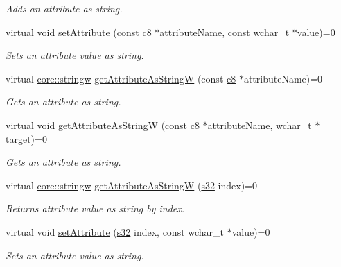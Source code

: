 \begin{DoxyCompactItemize}
\begin{DoxyCompactList}\small\item\em Adds an attribute as string. \end{DoxyCompactList}\item 
virtual void \hyperlink{classirr_1_1io_1_1IAttributes_a61d592097529c763c1da1db8ef5af224}{set\+Attribute} (const \hyperlink{namespaceirr_a9395eaea339bcb546b319e9c96bf7410}{c8} $\ast$attribute\+Name, const wchar\+\_\+t $\ast$value)=0
\begin{DoxyCompactList}\small\item\em Sets an attribute value as string. \end{DoxyCompactList}\item 
virtual \hyperlink{namespaceirr_1_1core_a5aedb62cb47cf01d1c548ab5e6344d2d}{core\+::stringw} \hyperlink{classirr_1_1io_1_1IAttributes_a874219751c3a52d781cdfa372cd8bcf5}{get\+Attribute\+As\+StringW} (const \hyperlink{namespaceirr_a9395eaea339bcb546b319e9c96bf7410}{c8} $\ast$attribute\+Name)=0
\begin{DoxyCompactList}\small\item\em Gets an attribute as string. \end{DoxyCompactList}\item 
virtual void \hyperlink{classirr_1_1io_1_1IAttributes_a972aca66779e767e635a1c52b1559382}{get\+Attribute\+As\+StringW} (const \hyperlink{namespaceirr_a9395eaea339bcb546b319e9c96bf7410}{c8} $\ast$attribute\+Name, wchar\+\_\+t $\ast$target)=0
\begin{DoxyCompactList}\small\item\em Gets an attribute as string. \end{DoxyCompactList}\item 
virtual \hyperlink{namespaceirr_1_1core_a5aedb62cb47cf01d1c548ab5e6344d2d}{core\+::stringw} \hyperlink{classirr_1_1io_1_1IAttributes_a60ab65d3d3e123af2b2d47b1bd48f771}{get\+Attribute\+As\+StringW} (\hyperlink{namespaceirr_ac66849b7a6ed16e30ebede579f9b47c6}{s32} index)=0
\begin{DoxyCompactList}\small\item\em Returns attribute value as string by index. \end{DoxyCompactList}\item 
virtual void \hyperlink{classirr_1_1io_1_1IAttributes_a679ae0badc391b6814db9cd7cf3d45bc}{set\+Attribute} (\hyperlink{namespaceirr_ac66849b7a6ed16e30ebede579f9b47c6}{s32} index, const wchar\+\_\+t $\ast$value)=0
\begin{DoxyCompactList}\small\item\em Sets an attribute value as string. \end{DoxyCompactList}\item 

\end{DoxyCompactItemize}
